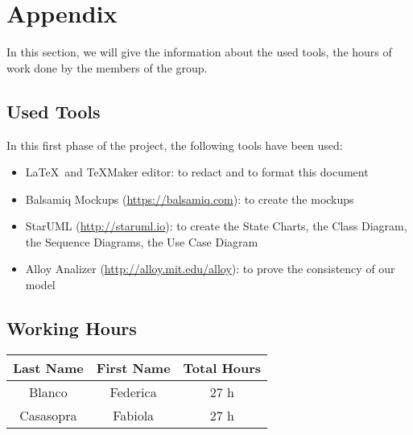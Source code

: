 \section{Appendix} \label{sec:appendix}

In this section, we will give the information about the used tools, the hours of work done by the members of the group.

\subsection{Used Tools} \label{tools}

In this first phase of the project, the following tools have been used:

\begin{itemize}
	\item \LaTeX\ and TeXMaker editor: to redact and to format this document
	\item Balsamiq Mockups (\url{https://balsamiq.com}): to create the mockups
	\item StarUML (\url{http://staruml.io}): to create the State Charts, the Class Diagram, the Sequence Diagrams, the Use Case Diagram 
	\item Alloy Analizer (\url{http://alloy.mit.edu/alloy}): to prove the consistency of our model
\end{itemize}

\subsection{Working Hours} \label{worked}

\begin{table}[htbp]
\begin{center}
\begin{tabular}[t]{ccc}

\hline
\textbf{Last Name} & \textbf{First Name} & \textbf{Total Hours} \\
\hline
Blanco & Federica &  27 h\\
\hline
Casasopra & Fabiola &  27 h\\
\hline

\end{tabular}
\end{center}
\end{table}


